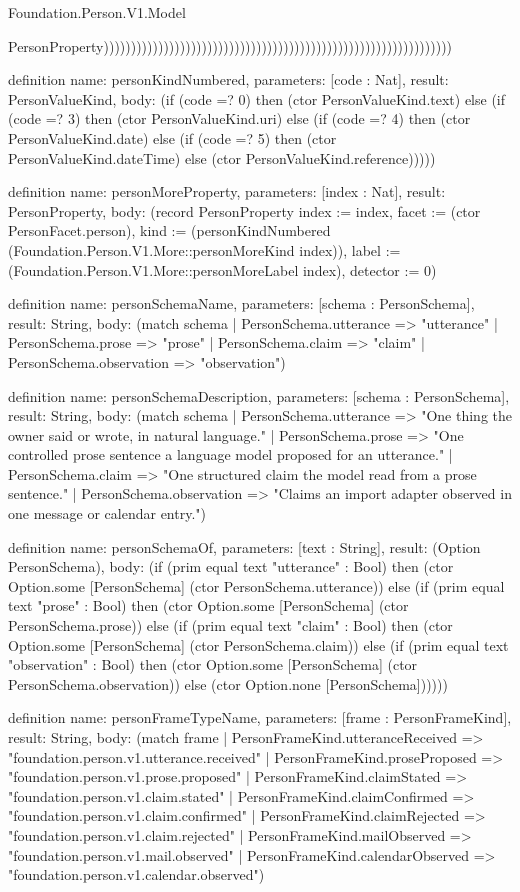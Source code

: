\begin{lexlean}{Foundation.Person.V1.Model}
\begin{semanticmodule}
{PersonProperty))))))))))))))))))))))))))))))))))))))))))))))))))))))))))))))))
}

definition{
  name: personKindNumbered,
  parameters: [code : Nat],
  result: PersonValueKind,
  body: (if (code =? 0) then (ctor PersonValueKind.text) else (if (code =? 3) then (ctor PersonValueKind.uri) else (if (code =? 4) then (ctor PersonValueKind.date) else (if (code =? 5) then (ctor PersonValueKind.dateTime) else (ctor PersonValueKind.reference)))))
}

definition{
  name: personMoreProperty,
  parameters: [index : Nat],
  result: PersonProperty,
  body: (record PersonProperty {index := index, facet := (ctor PersonFacet.person), kind := (personKindNumbered (Foundation.Person.V1.More::personMoreKind index)), label := (Foundation.Person.V1.More::personMoreLabel index), detector := 0})
}

definition{
  name: personSchemaName,
  parameters: [schema : PersonSchema],
  result: String,
  body: (match schema
    | PersonSchema.utterance => "utterance"
    | PersonSchema.prose => "prose"
    | PersonSchema.claim => "claim"
    | PersonSchema.observation => "observation")
}

definition{
  name: personSchemaDescription,
  parameters: [schema : PersonSchema],
  result: String,
  body: (match schema
    | PersonSchema.utterance => "One thing the owner said or wrote, in natural language."
    | PersonSchema.prose => "One controlled prose sentence a language model proposed for an utterance."
    | PersonSchema.claim => "One structured claim the model read from a prose sentence."
    | PersonSchema.observation => "Claims an import adapter observed in one message or calendar entry.")
}

definition{
  name: personSchemaOf,
  parameters: [text : String],
  result: (Option PersonSchema),
  body: (if (prim equal text "utterance" : Bool) then (ctor Option.some [PersonSchema] (ctor PersonSchema.utterance)) else (if (prim equal text "prose" : Bool) then (ctor Option.some [PersonSchema] (ctor PersonSchema.prose)) else (if (prim equal text "claim" : Bool) then (ctor Option.some [PersonSchema] (ctor PersonSchema.claim)) else (if (prim equal text "observation" : Bool) then (ctor Option.some [PersonSchema] (ctor PersonSchema.observation)) else (ctor Option.none [PersonSchema])))))
}

definition{
  name: personFrameTypeName,
  parameters: [frame : PersonFrameKind],
  result: String,
  body: (match frame
    | PersonFrameKind.utteranceReceived => "foundation.person.v1.utterance.received"
    | PersonFrameKind.proseProposed => "foundation.person.v1.prose.proposed"
    | PersonFrameKind.claimStated => "foundation.person.v1.claim.stated"
    | PersonFrameKind.claimConfirmed => "foundation.person.v1.claim.confirmed"
    | PersonFrameKind.claimRejected => "foundation.person.v1.claim.rejected"
    | PersonFrameKind.mailObserved => "foundation.person.v1.mail.observed"
    | PersonFrameKind.calendarObserved => "foundation.person.v1.calendar.observed")
}


\end{semanticmodule}
\end{lexlean}
